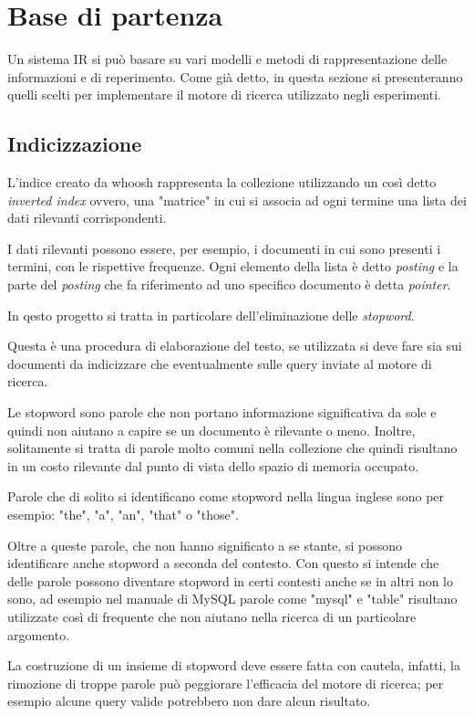 \documentclass[runningheads]{llncs}
\begin{document}
\section{Base di partenza}
\label{sec:base-di-partenza}
Un sistema IR si pu\`o basare su vari modelli e metodi di rappresentazione delle informazioni e di reperimento.
Come gi\`a detto, in questa sezione si presenteranno quelli scelti per implementare il motore di ricerca utilizzato negli esperimenti.

\subsection{Indicizzazione}
L'indice creato da whoosh rappresenta la collezione utilizzando un cos\`i detto \emph{inverted index}\cite{WBC_ii} ovvero, una "matrice" in cui si associa ad ogni termine
una lista dei dati rilevanti corrispondenti.

I dati rilevanti possono essere, per esempio, i documenti in cui sono presenti i termini, con le rispettive frequenze.
Ogni elemento della lista \`e detto \emph{posting} e la parte del \emph{posting} che fa riferimento ad uno specifico documento
\`e detta \emph{pointer}.

In qesto progetto si tratta in particolare dell'eliminazione delle \emph{stopword}\cite{WBC_stopword}.

Questa \`e una procedura di elaborazione del testo, se utilizzata si deve fare sia sui documenti da indicizzare 
che eventualmente sulle query inviate al motore di ricerca.

Le stopword sono parole che non portano informazione significativa da sole e quindi non aiutano a capire se un documento \`e rilevante o meno.
Inoltre, solitamente si tratta di parole molto comuni nella collezione che quindi risultano in un costo rilevante dal punto di vista dello spazio di memoria occupato.

Parole che di solito si identificano come stopword nella lingua inglese sono per esempio: "the", "a", "an", "that" o "those".

Oltre a queste parole, che non hanno significato a se stante, si possono identificare anche stopword a seconda del contesto. 
Con questo si intende che delle parole possono diventare stopword in certi contesti anche se in altri non lo sono, ad esempio nel manuale di
MySQL parole come "mysql" e "table" risultano utilizzate cos\`i di frequente che non aiutano nella ricerca di un particolare argomento.

La costruzione di un insieme di stopword deve essere fatta con cautela, infatti, la rimozione di troppe parole pu\`o peggiorare l'efficacia del motore di ricerca;
per esempio alcune query valide potrebbero non dare alcun risultato.
\end{document}
